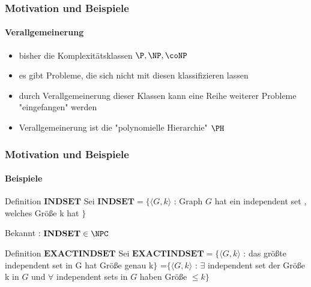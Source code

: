 \begin{frame}
		\frametitle{Motivation und Beispiele}
		\framesubtitle{Verallgemeinerung}
		
		\begin{itemize}[<+->]
			\item bisher die Komplexitätsklassen $\P, \NP , \coNP$
			\item es gibt Probleme, die sich nicht mit diesen klassifizieren lassen
			\item durch Verallgemeinerung dieser Klassen kann eine Reihe weiterer Probleme "eingefangen" werden
			\item Verallgemeinerung ist die "polynomielle Hierarchie" $\PH$ 
		\end{itemize}
\end{frame}
\begin{frame}
	\frametitle{Motivation und Beispiele}
	\framesubtitle{Beispiele}
	
	\begin{KITinfoblock}{Definition $\mathbf{INDSET}$}
	Sei $\mathbf{INDSET} = \lbrace \langle G,k \rangle $ : Graph $G$ hat ein
	independent set , welches Größe k hat $\rbrace$
	\end{KITinfoblock}
	\bigskip
	\pause
	Bekannt : $\mathbf{INDSET} \in \NPC$
	\bigskip
	\pause
	\begin{KITinfoblock}{Definition $\mathbf{EXACT INDSET}$}
	Sei $\mathbf{EXACT INDSET} = \lbrace \langle G,k \rangle $ : das größte
	independent set in G hat Größe genau k$\rbrace$ \newline
	=$\lbrace \langle G,k \rangle$ : $\exists$ independent set der Größe k in $G$
	und $\forall$ independent sets in $G$ haben Größe $\leq k \rbrace$
	\end{KITinfoblock}
\end{frame}
